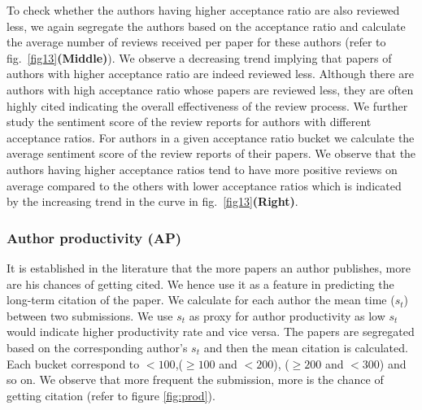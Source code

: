 To check whether the authors having higher acceptance ratio are also reviewed less, we again segregate the authors based on the acceptance ratio and calculate the average number of reviews received per paper for these authors (refer to fig.~\ref{fig13}{\bf (Middle)}). We observe a decreasing trend implying that papers of authors with higher acceptance ratio are indeed reviewed less. Although there are authors with high acceptance ratio whose papers are reviewed less, they are often highly cited indicating the overall effectiveness of the review process. We further study the sentiment score of the review reports for authors with different acceptance ratios. For authors in a given  acceptance ratio bucket we calculate the average sentiment score of the review reports of their papers.
We observe that the authors having higher acceptance ratios tend to have more positive reviews on average compared to the others with lower acceptance ratios which is indicated by the increasing trend in the curve in fig.~\ref{fig13}{\bf (Right)}. 

\subsubsection{Author productivity (AP)} It is established in the literature \cite{yan2012better} that the more papers an author publishes, more are his chances of getting cited. We hence use it as a feature in predicting the long-term citation of the paper. We calculate for each author the mean time ($s_t$) between two submissions. We use $s_t$ as proxy for author productivity as low $s_t$ would indicate higher productivity rate and vice versa.  
The papers are segregated based on the corresponding author's $s_t$ and then the mean citation is calculated. Each bucket correspond to $<100$,($\geq 100$ and $< 200$), ($\geq 200$ and $<300$) and so on. We observe that more frequent the submission, more is the chance of getting citation (refer to figure \ref{fig:prod}).



%

\begin{table}[]
\centering
\caption{The F-statistics value for all the features used for predicting the long-term citation of the paper.}
\label{tab:f_score}
\end{table}

